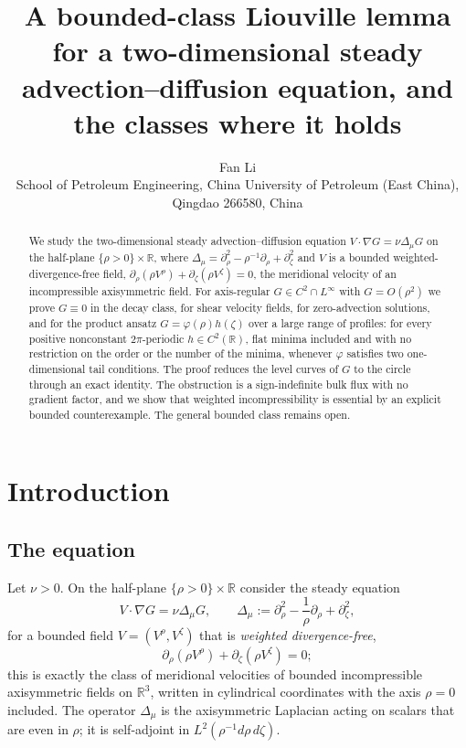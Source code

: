 \documentclass[11pt]{article}
\title{A bounded-class Liouville lemma for a two-dimensional steady\\
advection--diffusion equation, and the classes where it holds}
\author{Fan Li\\[8pt]
{\small School of Petroleum Engineering, China University of Petroleum (East China),}\\[2pt]
{\small Qingdao 266580, China}}
\date{}
\theoremstyle{definition}
\newcommand{\R}{\mathbb{R}}
\begin{document}
\maketitle

\begin{abstract}
We study the two-dimensional steady advection--diffusion equation
$V\cdot\nabla G=\nu\Delta_\mu G$ on the half-plane $\{\rho>0\}\times\R$, where
$\Delta_\mu=\partial_\rho^2-\rho^{-1}\partial_\rho+\partial_\zeta^2$ and $V$ is
a bounded weighted-divergence-free field,
$\partial_\rho(\rho V^\rho)+\partial_\zeta(\rho V^\zeta)=0$, the meridional
velocity of an incompressible axisymmetric field. For axis-regular
$G\in C^2\cap L^\infty$ with $G=O(\rho^2)$ we prove $G\equiv0$ in the decay
class, for shear velocity fields, for zero-advection solutions, and for the
product ansatz $G=\varphi(\rho)h(\zeta)$ over a large range of profiles: for
every positive nonconstant $2\pi$-periodic $h\in C^2(\R)$, flat minima
included and with no restriction on the order or the number of the minima,
whenever $\varphi$ satisfies two one-dimensional tail conditions. The proof
reduces the level curves of $G$ to the circle through an exact identity. The
obstruction is a sign-indefinite bulk flux with no gradient factor, and we
show that weighted incompressibility is essential by an explicit bounded
counterexample. The general bounded class remains open.
\end{abstract}

\section{Introduction}

\subsection{The equation}
Let $\nu>0$. On the half-plane $\{\rho>0\}\times\R$ consider the steady
equation
\begin{equation}\label{eq:2d-intro}
V\cdot\nabla G=\nu\Delta_\mu G,\qquad
\Delta_\mu:=\partial_\rho^2-\frac1\rho\partial_\rho+\partial_\zeta^2 ,
\end{equation}
for a bounded field $V=(V^\rho,V^\zeta)$ that is \emph{weighted
divergence-free},
\begin{equation}\label{eq:wdiv-intro}
\partial_\rho(\rho V^\rho)+\partial_\zeta(\rho V^\zeta)=0 ;
\end{equation}
this is exactly the class of meridional velocities of bounded incompressible
axisymmetric fields on $\R^3$, written in cylindrical coordinates with the
axis $\rho=0$ included. The operator $\Delta_\mu$ is the axisymmetric
Laplacian acting on scalars that are even in $\rho$; it is self-adjoint in
$L^2(\rho^{-1}d\rho\,d\zeta)$.
\end{document}
